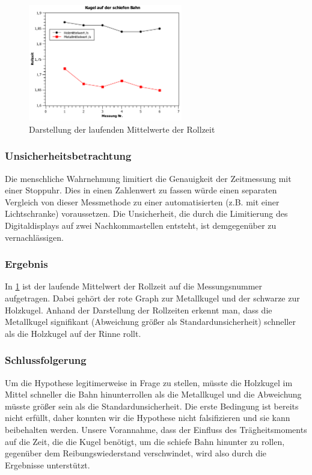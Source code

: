 \documentclass[
	a4paper,
	12pt,
	pagesize,
	ngerman
]{scrartcl}
\begin{document}
	\begin{figure}[htb]
	  \centering
	    \includegraphics[width=0.6\textwidth]{Kugel_auf_schiefer_Bahn} %
	  \caption{Darstellung der laufenden Mittelwerte der Rollzeit}
		\label{graph}
	\end{figure}
	\subsubsection{Unsicherheitsbetrachtung}
	Die menschliche Wahrnehmung limitiert die Genauigkeit der Zeitmessung mit einer Stoppuhr. Dies in einen Zahlenwert zu fassen würde einen separaten Vergleich von dieser Messmethode zu einer automatisierten (z.B. mit einer Lichtschranke) voraussetzen. Die Unsicherheit, die durch die Limitierung des Digitaldisplays auf zwei Nachkommastellen entsteht, ist demgegenüber zu vernachlässigen.
	\subsubsection{Ergebnis}
	 In \cref{graph} ist der laufende Mittelwert der Rollzeit auf die Messungsnummer aufgetragen. Dabei gehört der rote Graph zur Metallkugel und der schwarze zur Holzkugel. Anhand der Darstellung der Rollzeiten erkennt man, dass die Metallkugel signifikant (Abweichung größer als Standardunsicherheit) schneller als die Holzkugel auf der Rinne rollt.
	\subsubsection{Schlussfolgerung}
	Um die Hypothese legitimerweise in Frage zu stellen, müsste die Holzkugel im Mittel schneller die Bahn hinunterrollen als die Metallkugel und die Abweichung müsste größer sein als die Standardunsicherheit. Die erste Bedingung ist bereits nicht erfüllt, daher konnten wir die Hypothese nicht falsifizieren und sie kann beibehalten werden. Unsere Vorannahme, dass der Einfluss des Trägheitsmoments auf die Zeit, die die Kugel benötigt, um die schiefe Bahn hinunter zu rollen, gegenüber dem Reibungswiederstand verschwindet, wird also durch die Ergebnisse unterstützt.
	
	
\end{document}

